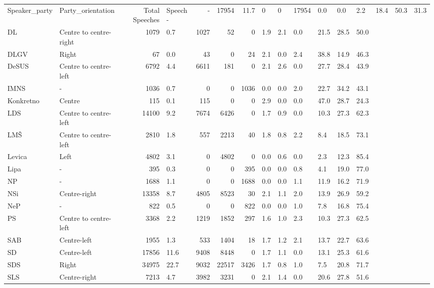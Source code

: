\begin{tabular}{llrlrrrllllll}
\toprule
Speaker_party & Party_orientation & Total Speeches & Speech %
\midrule
- & - & 17954 & 11.7 & 0 & 0 & 17954 & 0.0 & 0.0 & 2.2 & 18.4 & 50.3 & 31.3 \\
DL & Centre to centre-right & 1079 & 0.7 & 1027 & 52 & 0 & 1.9 & 2.1 & 0.0 & 21.5 & 28.5 & 50.0 \\
DLGV & Right & 67 & 0.0 & 43 & 0 & 24 & 2.1 & 0.0 & 2.4 & 38.8 & 14.9 & 46.3 \\
DeSUS & Centre to centre-left & 6792 & 4.4 & 6611 & 181 & 0 & 2.1 & 2.6 & 0.0 & 27.7 & 28.4 & 43.9 \\
IMNS & - & 1036 & 0.7 & 0 & 0 & 1036 & 0.0 & 0.0 & 2.0 & 22.7 & 34.2 & 43.1 \\
Konkretno & Centre & 115 & 0.1 & 115 & 0 & 0 & 2.9 & 0.0 & 0.0 & 47.0 & 28.7 & 24.3 \\
LDS & Centre to centre-left & 14100 & 9.2 & 7674 & 6426 & 0 & 1.7 & 0.9 & 0.0 & 10.3 & 27.3 & 62.3 \\
LMŠ & Centre to centre-left & 2810 & 1.8 & 557 & 2213 & 40 & 1.8 & 0.8 & 2.2 & 8.4 & 18.5 & 73.1 \\
Levica & Left & 4802 & 3.1 & 0 & 4802 & 0 & 0.0 & 0.6 & 0.0 & 2.3 & 12.3 & 85.4 \\
Lipa & - & 395 & 0.3 & 0 & 0 & 395 & 0.0 & 0.0 & 0.8 & 4.1 & 19.0 & 77.0 \\
NP & - & 1688 & 1.1 & 0 & 0 & 1688 & 0.0 & 0.0 & 1.1 & 11.9 & 16.2 & 71.9 \\
NSi & Centre-right & 13358 & 8.7 & 4805 & 8523 & 30 & 2.1 & 1.1 & 2.0 & 13.9 & 26.9 & 59.2 \\
NeP & - & 822 & 0.5 & 0 & 0 & 822 & 0.0 & 0.0 & 1.0 & 7.8 & 16.8 & 75.4 \\
PS & Centre to centre-left & 3368 & 2.2 & 1219 & 1852 & 297 & 1.6 & 1.0 & 2.3 & 10.3 & 27.3 & 62.5 \\
SAB & Centre-left & 1955 & 1.3 & 533 & 1404 & 18 & 1.7 & 1.2 & 2.1 & 13.7 & 22.7 & 63.6 \\
SD & Centre-left & 17856 & 11.6 & 9408 & 8448 & 0 & 1.7 & 1.1 & 0.0 & 13.1 & 25.3 & 61.6 \\
SDS & Right & 34975 & 22.7 & 9032 & 22517 & 3426 & 1.7 & 0.8 & 1.0 & 7.5 & 20.8 & 71.7 \\
SLS & Centre-right & 7213 & 4.7 & 3982 & 3231 & 0 & 2.1 & 1.4 & 0.0 & 20.6 & 27.8 & 51.6 \\

\end{tabular}
